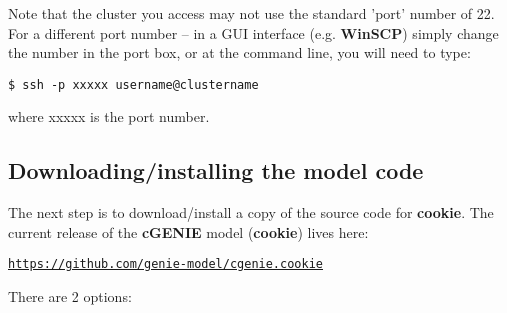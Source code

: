\vspace{1mm}
Note that the cluster you access may not use the standard 'port' number of \textsf{\footnotesize 22}. For a different port number -- in a GUI interface (e.g. \textbf{WinSCP}) simply change the number in the port box, or at the command line, you will need to type:
\vspace{-1mm}
\begin{verbatim}
$ ssh -p xxxxx username@clustername
\end{verbatim}
\vspace{-1mm}
where \textsf{\footnotesize xxxxx} is the port number.


\subsection{Downloading/installing the model code}

The next step is to download/install a copy of the source code for \textbf{cookie}. The current release of the \textbf{cGENIE} model (\textbf{cookie}) lives here:

\vspace{1mm}
\href{https://github.com/genie-model/cgenie.cookie}{\texttt{https://github.com/genie-model/cgenie.cookie}}
\vspace{2mm}

There are 2 options:

